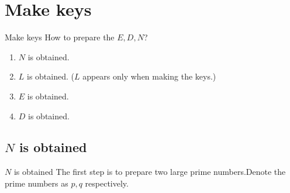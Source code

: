 \documentclass[dvipdfmx]{beamer}
\begin{document}
\section{Make keys}
\begin{frame}{Make keys}
    How to prepare the \(E,D,N\)?
    \begin{enumerate}
        \item \(N\) is obtained.
        \item \(L\) is obtained. (\(L\) appears only when making the keys.)
        \item \(E\) is obtained.
        \item \(D\) is obtained.
    \end{enumerate}
\end{frame}
\subsection{\(N\) is obtained}
\begin{frame}{\(N\) is obtained}
    The first step is to prepare two large prime numbers.Denote the prime numbers as \(p,q\) respectively.
\end{frame}
\end{document}
